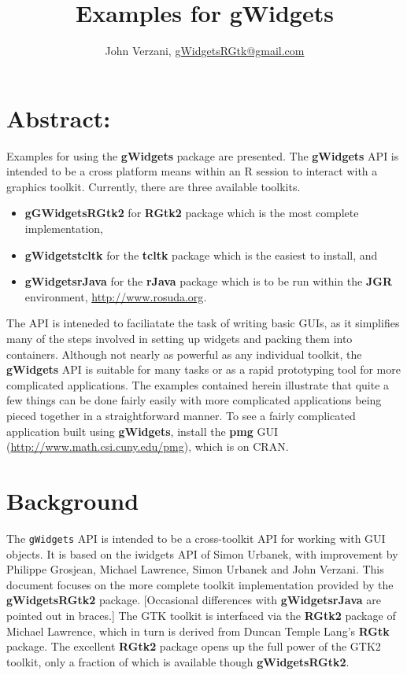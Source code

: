 \documentclass[12pt]{article}
\newcommand{\RCode}[1]{\texttt{#1}}
\newcommand{\RPackage}[1]{\textbf{#1}}
\begin{document}
\thispagestyle{plain}
\title{Examples for gWidgets}

\author{John Verzani, \url{gWidgetsRGtk@gmail.com}}
\maketitle

\section*{Abstract:}
Examples for using the \RPackage{gWidgets} package are presented.  The
\RPackage{gWidgets} API is intended to be a cross platform means
within an R session to interact with a graphics toolkit.  Currently,
there are three available toolkits.
\begin{itemize}
\item \RPackage{gGWidgetsRGtk2} for \RPackage{RGtk2} package which is the most complete implementation,
\item \RPackage{gWidgetstcltk} for the \RPackage{tcltk} package which
  is the easiest to install, and

\item \RPackage{gWidgetsrJava} for the \RPackage{rJava} package which is
  to be run within the \RPackage{JGR} environment, \url{http://www.rosuda.org}.
\end{itemize}


The API is inteneded to faciliatate the task of writing basic GUIs, as
it simplifies many of the steps involved in setting up widgets and
packing them into containers. Although not nearly as powerful as any
individual toolkit, the \RPackage{gWidgets} API is suitable for many
tasks or as a rapid prototyping tool for more complicated
applications. The examples contained herein illustrate that quite a
few things can be done fairly easily with more complicated
applications being pieced together in a straightforward manner.  To
see a fairly complicated application built using \RPackage{gWidgets},
install the \RPackage{pmg} GUI
(\url{http://www.math.csi.cuny.edu/pmg}), which is on CRAN.


\setcounter{tocdepth}{3}
\tableofcontents

\section{Background}
The \RCode{gWidgets} API is intended to be a cross-toolkit API for
working with GUI objects. It is based on the iwidgets API of Simon
Urbanek, with improvement by Philippe Grosjean, Michael Lawrence,
Simon Urbanek and John Verzani.  This document focuses on the more
complete toolkit implementation provided by the
\RPackage{gWidgetsRGtk2} package. [Occasional differences with
\RPackage{gWidgetsrJava} are pointed out in braces.] The GTK toolkit
is interfaced via the \RPackage{RGtk2} package of Michael Lawrence,
which in turn is derived from Duncan Temple Lang's \RPackage{RGtk}
package. The excellent \RPackage{RGtk2} package opens up the full
power of the GTK2 toolkit, only a fraction of which is available
though \RPackage{gWidgetsRGtk2}.
\end{document}
